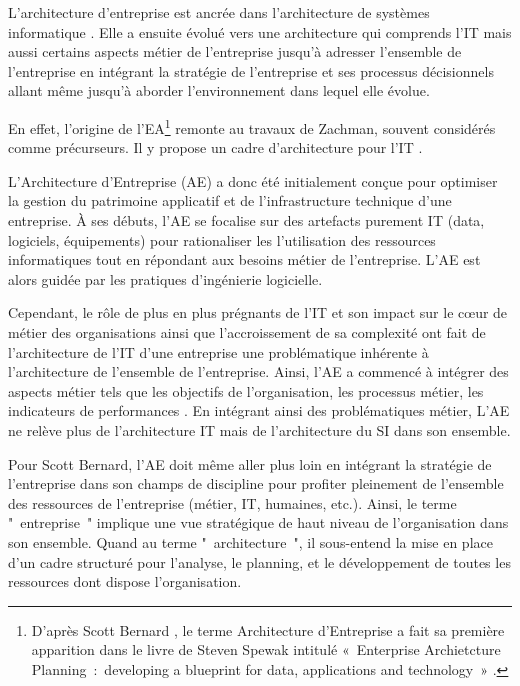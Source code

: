 L'architecture d'entreprise est ancrée dans l'architecture de systèmes 
informatique \cite{kappelman2008enterprise}. Elle a ensuite évolué vers une 
architecture qui comprends l'IT mais aussi certains aspects métier de l'entreprise 
\cite{winter2006essential}  jusqu'à adresser l'ensemble de l'entreprise en 
intégrant la stratégie de l'entreprise et ses processus décisionnels 
\cite{ross2006enterprise} allant même jusqu'à aborder l'environnement dans 
lequel elle évolue.

En effet, l'origine de l'EA\footnote{D'après Scott Bernard 
\cite{bernard2012introduction}, le terme Architecture d'Entreprise a fait sa 
première apparition dans le livre de Steven Spewak intitulé «~Enterprise 
Archietcture Planning~:~developing a blueprint for data, applications and 
technology~» \cite{spewak1993enterprise}.} remonte au travaux de Zachman, souvent 
considérés comme précurseurs. Il y propose un cadre d'architecture pour l'IT 
\cite{zachman1987framework}.

L'Architecture d'Entreprise (AE) a donc été initialement  conçue pour 
optimiser la gestion du patrimoine applicatif et de l'infrastructure technique d'une  
entreprise. À ses débuts, l'AE se focalise sur des artefacts purement IT (data, logiciels, équipements) pour 
rationaliser les l'utilisation des ressources informatiques 
\cite{winter2006essential} tout en répondant aux besoins métier de l'entreprise. 
L'AE est alors guidée par les pratiques d'ingénierie logicielle. 

Cependant, le rôle de plus en plus prégnants de l'IT et son impact sur le 
c\oe{}ur de métier des organisations ainsi que l'accroissement de sa complexité 
\cite{ranganathan2005enterprise} ont fait de l'architecture de l'IT d'une 
entreprise une problématique inhérente à l'architecture de l'ensemble de 
l'entreprise. Ainsi, l'AE a commencé à intégrer des aspects métier tels que les 
objectifs de l'organisation, les processus métier, les indicateurs de 
performances \cite{winter2006essential}. En intégrant ainsi des problématiques 
métier, L'AE ne relève plus de l'architecture IT mais de l'architecture du SI 
dans son ensemble.

Pour Scott Bernard, l'AE doit même aller plus loin en intégrant la stratégie de 
l'entreprise \cite{bernard2012introduction} dans son champs de discipline pour 
profiter pleinement de l'ensemble des ressources de l'entreprise (métier, IT, 
humaines, etc.). Ainsi, le terme "~entreprise~" implique une vue stratégique de 
haut niveau de l'organisation dans son ensemble. Quand au terme 
"~architecture~", il sous-entend la mise en place d'un cadre structuré pour 
l'analyse, le planning, et le développement de toutes les ressources dont 
dispose l'organisation. 

